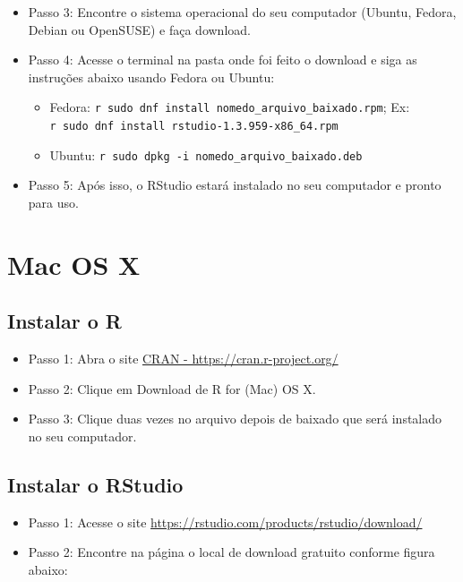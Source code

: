 \documentclass[
  brazil,
]{book}
\providecommand{\tightlist}{%
  \setlength{\itemsep}{0pt}\setlength{\parskip}{0pt}}
\begin{document}
\begin{itemize}
\tightlist
\item
  Passo 3: Encontre o sistema operacional do seu computador (Ubuntu, Fedora, Debian ou OpenSUSE) e faça download.\\
\item
  Passo 4: Acesse o terminal na pasta onde foi feito o download e siga as instruções abaixo usando Fedora ou Ubuntu:

  \begin{itemize}
  \tightlist
  \item
    Fedora: \texttt{r\ sudo\ dnf\ install\ nomedo\_arquivo\_baixado.rpm}; Ex: \texttt{r\ sudo\ dnf\ install\ rstudio-1.3.959-x86\_64.rpm}
  \item
    Ubuntu: \texttt{r\ sudo\ dpkg\ -i\ nomedo\_arquivo\_baixado.deb}\\
  \end{itemize}
\item
  Passo 5: Após isso, o RStudio estará instalado no seu computador e pronto para uso.
\end{itemize}

\hypertarget{mac-os-x}{%
\section{Mac OS X}\label{mac-os-x}}

\hypertarget{instalar-o-r-1}{%
\subsection{Instalar o R}\label{instalar-o-r-1}}

\begin{itemize}
\tightlist
\item
  Passo 1: Abra o site \href{https://cran.r-project.org/}{CRAN - https://cran.r-project.org/}
\item
  Passo 2: Clique em Download de R for (Mac) OS X.\\
\item
  Passo 3: Clique duas vezes no arquivo depois de baixado que será instalado no seu computador.
\end{itemize}

\hypertarget{instalar-o-rstudio-1}{%
\subsection{Instalar o RStudio}\label{instalar-o-rstudio-1}}

\begin{itemize}
\tightlist
\item
  Passo 1: Acesse o site \url{https://rstudio.com/products/rstudio/download/}\\
\item
  Passo 2: Encontre na página o local de download gratuito conforme figura abaixo:
\end{itemize}
\end{document}
